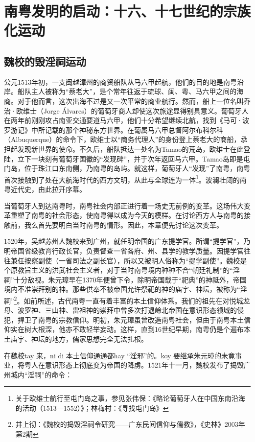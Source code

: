 \chapter{南粤发明的启动：十六、十七世纪的宗族化运动}

\section{魏校的毁淫祠运动}

\indent 公元1513年初，一支闽越漳州的商贸船队从马六甲起航，他们的目的地是南粤沿岸。船队主人被称为“蔡老大”，是个常年往返于琉球、闽、粤、马六甲之间的海商。对于他而言，这次出海不过是又一次平常的商业航行。然而，船上一位名叫乔治·欧维士（Jorge Álvares）的葡萄牙商人却使这次旅途显得别具意义。葡萄牙人在两年前刚刚攻占南亚交通要道马六甲，他们十分希望继续北航，找到《马可·波罗游记》中所记载的那个神秘东方世界。在葡属马六甲总督阿尔布科尔科（Albuquerque）的命令下，欧维士以“商务代理人”的身份登上蔡老大的商船，承担起发现新世界的使命。不久后，船队抵达一处名为Tamao的荒岛，欧维士在此登陆，立下一块刻有葡萄牙国徽的“发现碑”，并于次年返回马六甲。Tamao岛即是屯门岛，位于珠江口东南侧，乃南粤的岛屿。就这样，葡萄牙人“发现”了南粤，南粤首次接触到了处在大航海时代的西方文明，从此与全球连为一体\footnote{关于欧维士航行至屯门岛之事，参见张伟保：《略论葡萄牙人在中国东南沿海的活动（1513—1552）》；林梅村：《寻找屯门岛》}。波澜壮阔的南粤近代史，由此拉开序幕。

当葡萄牙人到达南粤时，南粤社会内部正进行着一场史无前例的变革。这场伟大变革重塑了南粤的社会形态，使南粤得以成为今天的模样。在讨论西方人与南粤的接触前，我么首先要明白当时南粤的情形。因此，本章便先讨论这次变革。

1520年，吴越苏州人魏校来到广州，就任明帝国的广东提学官。所谓“提学官”，乃明帝国省级教育行政长官，负责督查一省各府、州、县学的教学质量。因提学官往往兼任按察副使（一省司法之副长官），所以又被明人俗称为“提学副使”。魏校是个原教旨主义的洪武社会主义者，对于当时南粤境内种种不合“朝廷礼制”的“淫祠”十分敌视。朱元璋早在1370年便曾下令，除明帝国载于“祀典”的神祗外，帝国境内不准崇拜别的神。那些供奉不被帝国允许祭祀的神的庙宇、神坛，被称为“淫祠”\footnote{井上彻：《魏校的捣毁淫祠令研究——广东民间信仰与儒教》，《史林》2003年第2期}。如前所述，古代南粤一直有着丰富的本土信仰体系。我们的祖先在对悦城龙母、波罗神、三山神、雷祖神的崇拜中曾多次打退岭北帝国在意识形态领域的侵犯，捍卫了南粤的宗教信仰。明初，朱元璋虽曾改造南粤社会，但由于南粤本土信仰实在树大根深，他亦不敢轻举妄动。这样，直到16世纪早期，南粤仍是个遍布本土庙宇、神坛的地方，儒家思想完全无法扎根。 

在魏校tay 来，ni di 本土信仰通通都hay “淫邪”的。koy 要继承朱元璋的未竟事业，将粤人在意识形态上彻底变为帝国的降虏。1521年十一月，魏校发布了捣毁广州城内“淫祠”的命令：

